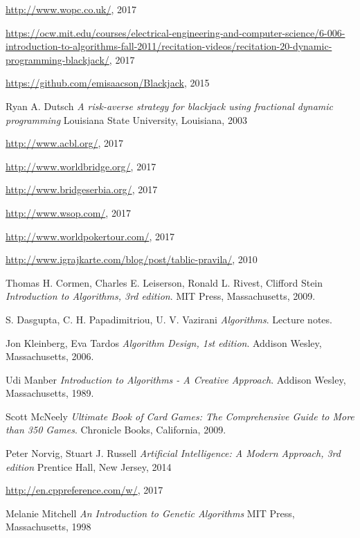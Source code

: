 \documentclass[a4paper, 12pt, ngerman]{article}
\begin{document}
\begin{thebibliography}{100}

\url{http://www.wopc.co.uk/}, 2017

\url{https://ocw.mit.edu/courses/electrical-engineering-and-computer-science/6-006-introduction-to-algorithms-fall-2011/recitation-videos/recitation-20-dynamic-programming-blackjack/}, 2017

\url{https://github.com/emisaacson/Blackjack}, 2015

Ryan A. Dutsch
\textit{A risk-averse strategy for blackjack using fractional dynamic programming}
Louisiana State University, Louisiana, 2003

\url{http://www.acbl.org/}, 2017

\url{http://www.worldbridge.org/}, 2017

\url{http://www.bridgeserbia.org/}, 2017

\url{http://www.wsop.com/}, 2017

\url{http://www.worldpokertour.com/}, 2017

\url{http://www.igrajkarte.com/blog/post/tablic-pravila/}, 2010

Thomas H. Cormen, Charles E. Leiserson, Ronald L. Rivest, Clifford Stein
\textit{Introduction to Algorithms, 3rd edition}.
MIT Press, Massachusetts, 2009.

S. Dasgupta, C. H. Papadimitriou, U. V. Vazirani
\textit{Algorithms}.
Lecture notes.

Jon Kleinberg, Eva Tardos
\textit{Algorithm Design, 1st edition}.
Addison Wesley, Massachusetts, 2006.

Udi Manber
\textit{Introduction to Algorithms - A Creative Approach}.
Addison Wesley, Massachusetts, 1989.

Scott McNeely 
\textit{Ultimate Book of Card Games: The Comprehensive Guide to More than 350 Games}.
Chronicle Books, California, 2009.

Peter Norvig, Stuart J. Russell
\textit{Artificial Intelligence: A Modern Approach, 3rd edition}
Prentice Hall, New Jersey, 2014

\url{http://en.cppreference.com/w/}, 2017

Melanie Mitchell
\textit{An Introduction to Genetic Algorithms}
MIT Press, Massachusetts, 1998

\end{thebibliography}
\end{document}
